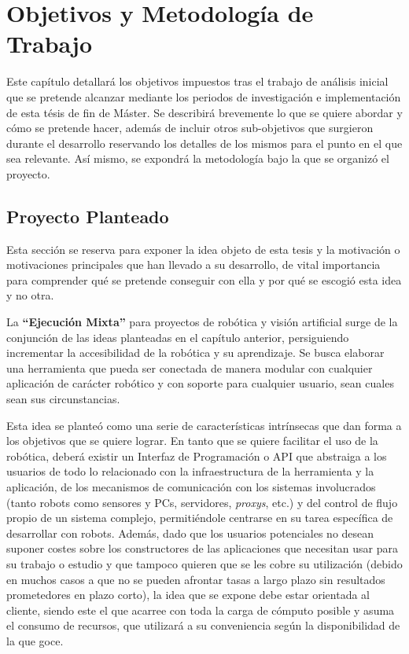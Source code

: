 \chapter{Objetivos y Metodología de Trabajo}

Este capítulo detallará los objetivos impuestos tras el trabajo de análisis inicial que se pretende alcanzar mediante los periodos de investigación e implementación de esta tésis de fin de Máster. Se describirá brevemente lo que se quiere abordar y cómo se pretende hacer, además de incluir otros sub-objetivos que surgieron durante el desarrollo reservando los detalles de los mismos para el punto en el que sea relevante. Así mismo, se expondrá la metodología bajo la que se organizó el proyecto.

\section{Proyecto Planteado}

Esta sección se reserva para exponer la idea objeto de esta tesis y la motivación o motivaciones principales que han llevado a su desarrollo, de vital importancia para comprender qué se pretende conseguir con ella y por qué se escogió esta idea y no otra.

La \textbf{``Ejecución Mixta''} para proyectos de robótica y visión artificial surge de la conjunción de las ideas planteadas en el capítulo anterior, persiguiendo incrementar la accesibilidad de la robótica y su aprendizaje. Se busca elaborar una herramienta que pueda ser conectada de manera modular con cualquier aplicación de carácter robótico y con soporte para cualquier usuario, sean cuales sean sus circunstancias.

Esta idea se planteó como una serie de características intrínsecas que dan forma a los objetivos que se quiere lograr. En tanto que se quiere facilitar el uso de la robótica, deberá existir un Interfaz de Programación o API que abstraiga a los usuarios de todo lo relacionado con la infraestructura de la herramienta y la aplicación, de los mecanismos de comunicación con los sistemas involucrados (tanto robots como sensores y PCs, servidores, \textit{proxys}, etc.) y del control de flujo propio de un sistema complejo, permitiéndole centrarse en su tarea específica de desarrollar con robots. Además, dado que los usuarios potenciales no desean suponer costes sobre los constructores de las aplicaciones que necesitan usar para su trabajo o estudio y que tampoco quieren que se les cobre su utilización (debido en muchos casos a que no se pueden afrontar tasas a largo plazo sin resultados prometedores en plazo corto), la idea que se expone debe estar orientada al cliente, siendo este el que acarree con toda la carga de cómputo posible y asuma el consumo de recursos, que utilizará a su conveniencia según la disponibilidad de la que goce.


